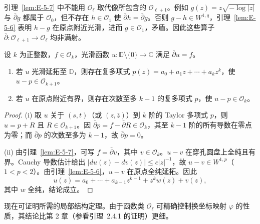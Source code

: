 \begin{remark}\label{rem:E-5-8}
引理~\ref{lem:E-5-7} 中不能用 $\mathcal O_\ell$ 取代像所包含的 $\mathcal O_{\ell+1}$。例如 $g(z)=z\sqrt{-\log|z|}$ 与 $\bar\partial g$ 都属于 $\mathcal O_0$，但不存在 $h\in\mathcal O_1$ 使 $\bar\partial h=\bar\partial g$。否则 $g-h\in W^{1,q}$，引理~\ref{lem:E-5-6} 表明 $h-g$ 在原点附近光滑，进而 $g\in\mathcal O_1$，矛盾。因此这些算子 $\bar\partial:\mathcal O_{\ell+1}\to\mathcal O_\ell$ 均非满射。
\end{remark}

\begin{lemma}\label{lem:E-5-9}
设 $k$ 为正整数，$f\in\mathcal O_k$，光滑函数 $u:\mathbb D\setminus\{0\}\to\mathbb C$ 满足 $\bar\partial u=f$。
\begin{enumerate}
\item[(i)] 若 $u$ 光滑延拓至 $\mathbb D$，则存在复多项式 $p(z)=a_0+a_1z+\cdots+a_kz^k$，使 $u-p\in\mathcal O_{k+1}$。
\item[(ii)] 若 $u$ 在原点附近有界，则存在次数至多 $k-1$ 的复多项式 $p$，使 $u-p\in\mathcal O_k$。
\end{enumerate}
\end{lemma}

\begin{proof}
(i) 取 $u$ 关于 $(s,t)$（或 $(z,\bar z)$）到 $k$ 阶的 Taylor 多项式 $p$，则 $u=p+R$ 且 $R\in\mathcal O_{k+1}$。因 $\bar\partial p=f-\bar\partial R\in\mathcal O_k$，其至 $k-1$ 阶的所有导数在零点为零；而 $\bar\partial p$ 的次数至多为 $k-1$，故 $\bar\partial p=0$。

(ii) 由引理~\ref{lem:E-5-7}，可写 $f=\bar\partial v$，其中 $v\in\mathcal O_k$。$u-v$ 在穿孔圆盘上全纯且有界。Cauchy 导数估计给出 $|du(z)-dv(z)|\le c|z|^{-1}$，故 $u-v\in W^{1,p}$（$1<p<2$）。由引理~\ref{lem:E-5-6}，$u-v$ 在原点全纯延拓。因此
\[
  u(z)=a_0+\cdots+a_{k-1}z^{k-1}+z^kw(z)+v(z),
\]
其中 $w$ 全纯，结论成立。
\end{proof}

现在可证明所需的局部结构定理。由于函数类 $\mathcal O_\ell$ 可精确控制换坐标映射 $\varphi$ 的性质，其结论比第 2 章（参看引理~2.4.1 的证明）更细。

